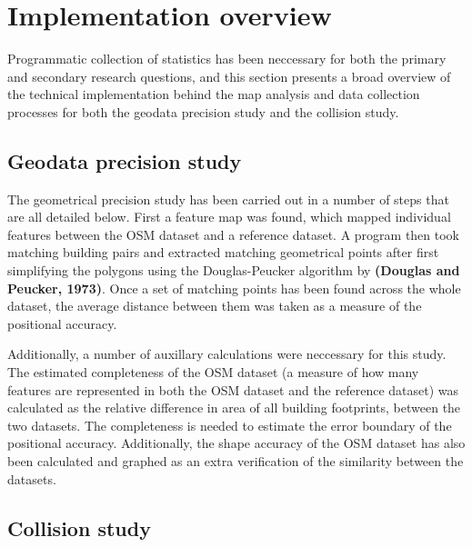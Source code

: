 \documentclass{kththesis}
\begin{document}
\section{Implementation overview}

Programmatic collection of statistics has been neccessary for both the primary and secondary research questions, and this section presents a broad overview of the technical implementation behind the map analysis and data collection processes for both the geodata precision study and the collision study.

\subsection{Geodata precision study}

The geometrical precision study has been carried out in a number of steps that are all detailed below.
First a feature map was found, which mapped individual features between the OSM dataset and a reference dataset.
A program then took matching building pairs and extracted matching geometrical points after first simplifying the polygons using the Douglas-Peucker algorithm by \textbf{(Douglas and Peucker, 1973)}.
Once a set of matching points has been found across the whole dataset, the average distance between them was taken as a measure of the positional accuracy.

Additionally, a number of auxillary calculations were neccessary for this study.
The estimated completeness of the OSM dataset (a measure of how many features are represented in both the OSM dataset and the reference dataset) was calculated as the relative difference in area of all building footprints, between the two datasets.
The completeness is needed to estimate the error boundary of the positional accuracy.
Additionally, the shape accuracy of the OSM dataset has also been calculated and graphed as an extra verification of the similarity between the datasets.

\subsection{Collision study}
\end{document}
